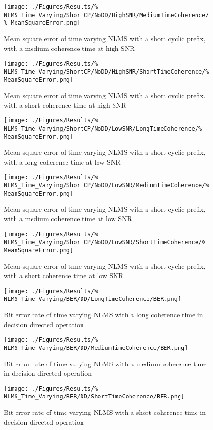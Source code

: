 \begin{figure}[ht]
	\texttt{[image: ./Figures/Results/\%
NLMS\_Time\_Varying/ShortCP/NoDD/HighSNR/MediumTimeCoherence/\%
MeanSquareError.png]}
	\caption{Mean square error of time varying NLMS with a 
	short cyclic prefix, with a medium coherence time at high SNR}
\end{figure}
\begin{figure}[ht]
	\texttt{[image: ./Figures/Results/\%
NLMS\_Time\_Varying/ShortCP/NoDD/HighSNR/ShortTimeCoherence/\%
MeanSquareError.png]}
	\caption{Mean square error of time varying NLMS with a 
	short cyclic prefix, with a short coherence time at high SNR}
\end{figure}
\begin{figure}[ht]
	\texttt{[image: ./Figures/Results/\%
NLMS\_Time\_Varying/ShortCP/NoDD/LowSNR/LongTimeCoherence/\%
MeanSquareError.png]}
	\caption{Mean square error of time varying NLMS with a 
	short cyclic prefix, with a long coherence time at low SNR}
\end{figure}
\begin{figure}[ht]
	\texttt{[image: ./Figures/Results/\%
NLMS\_Time\_Varying/ShortCP/NoDD/LowSNR/MediumTimeCoherence/\%
MeanSquareError.png]}
	\caption{Mean square error of time varying NLMS with a 
	short cyclic prefix, with a medium coherence time at low SNR}
\end{figure}
\begin{figure}[ht]
	\texttt{[image: ./Figures/Results/\%
NLMS\_Time\_Varying/ShortCP/NoDD/LowSNR/ShortTimeCoherence/\%
MeanSquareError.png]}
	\caption{Mean square error of time varying NLMS with a 
	short cyclic prefix, with a short coherence time at low SNR}
\end{figure}
\begin{figure}[ht]
	\texttt{[image: ./Figures/Results/\%
NLMS\_Time\_Varying/BER/DD/LongTimeCoherence/BER.png]}
	\caption{Bit error rate of time varying NLMS with a long coherence time 
	in decision directed operation}
	\label{fig:NLMS-BER-Long-DD-TV}
\end{figure}
\begin{figure}[ht]
	\texttt{[image: ./Figures/Results/\%
NLMS\_Time\_Varying/BER/DD/MediumTimeCoherence/BER.png]}
	\caption{Bit error rate of time varying NLMS with a medium coherence time 
	in decision directed operation}
\end{figure}
\begin{figure}[ht]
	\texttt{[image: ./Figures/Results/\%
NLMS\_Time\_Varying/BER/DD/ShortTimeCoherence/BER.png]}
	\caption{Bit error rate of time varying NLMS with a short coherence time 
	in decision directed operation}
\end{figure}
